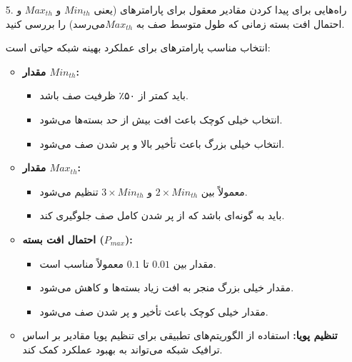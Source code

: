\begin{enumerate}
	\item [5. ]
	راه‌هایی برای پیدا کردن مقادیر معقول برای پارامترهای  (یعنی $Min_{th}$ و $Max_{th}$ و احتمال افت بسته زمانی که طول متوسط صف به $Max_{th}$​ می‌رسد) را بررسی کنید.
	\begin{qsolve}
		انتخاب مناسب پارامترهای  برای عملکرد بهینه شبکه حیاتی است:
		\begin{itemize}
			\item \textbf{مقدار $Min_{th}$:}
			\begin{itemize}
				\item باید کمتر از ۵۰٪ ظرفیت صف باشد.
				\item انتخاب خیلی کوچک باعث افت بیش از حد بسته‌ها می‌شود.
				\item انتخاب خیلی بزرگ باعث تأخیر بالا و پر شدن صف می‌شود.
			\end{itemize}
			\item \textbf{مقدار $Max_{th}$:}
			\begin{itemize}
				\item معمولاً بین \( 2 \times Min_{th} \) و \( 3 \times Min_{th} \) تنظیم می‌شود.
				\item باید به گونه‌ای باشد که از پر شدن کامل صف جلوگیری کند.
			\end{itemize}
			\item \textbf{احتمال افت بسته (\( P_{max} \)):}
			\begin{itemize}
				\item مقدار بین \( 0.01 \) تا \( 0.1 \) معمولاً مناسب است.
				\item مقدار خیلی بزرگ منجر به افت زیاد بسته‌ها و کاهش  می‌شود.
				\item مقدار خیلی کوچک باعث تأخیر و پر شدن صف می‌شود.
			\end{itemize}
			\item \textbf{تنظیم پویا:} استفاده از الگوریتم‌های تطبیقی برای تنظیم پویا مقادیر بر اساس ترافیک شبکه می‌تواند به بهبود عملکرد کمک کند.
		\end{itemize}
	\end{qsolve}
	
	
\end{enumerate}




